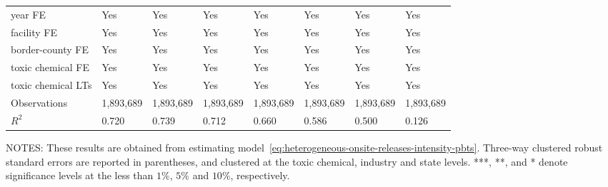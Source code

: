 \begin{table}[H]
{\begin{tabular}{@{}llllllll@{}}
            year FE                         & Yes       & Yes           & Yes       & Yes          & Yes             & Yes           & Yes                 \\
            facility FE                     & Yes       & Yes           & Yes       & Yes          & Yes             & Yes           & Yes                 \\
            border-county FE                & Yes       & Yes           & Yes       & Yes          & Yes             & Yes           & Yes                 \\
            toxic chemical FE               & Yes       & Yes           & Yes       & Yes          & Yes             & Yes           & Yes                 \\
            toxic chemical LTs              & Yes       & Yes           & Yes       & Yes          & Yes             & Yes           & Yes                 \\\midrule
            Observations                    & 1,893,689 & 1,893,689     & 1,893,689 & 1,893,689    & 1,893,689       & 1,893,689     & 1,893,689           \\
            $R^2$                           & 0.720     & 0.739         & 0.712     & 0.660        & 0.586           & 0.500         & 0.126               \\ \bottomrule\bottomrule
        \end{tabular}%
    }
    \begin{minipage}{\columnwidth}
        \vspace{0.05in}
        \tiny NOTES: These results are obtained from estimating model~\ref{eq:heterogeneous-onsite-releases-intensity-pbts}. Three-way clustered robust standard errors are reported in parentheses, and clustered at the toxic chemical, industry and state levels. ***, **, and * denote significance levels at the less than $1\%$, $5\%$ and $10\%$, respectively.
    \end{minipage}
\end{table}